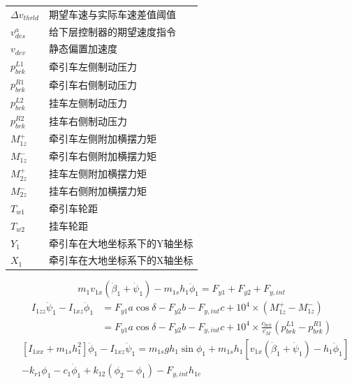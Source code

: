 {\begin{longtable}{l l}
        $\Delta v_{thrld}$ & 期望车速与实际车速差值阈值 \\
        $v_{des}^a$ & 给下层控制器的期望速度指令 \\
        $v_{dev}$ & 静态偏置加速度 \\
        $p_{brk}^{L1}$ & 牵引车左侧制动压力 \\
        $p_{brk}^{R1}$ & 牵引车右侧制动压力 \\
        $p_{brk}^{L2}$ & 挂车左侧制动压力 \\
        $p_{brk}^{R2}$ & 挂车右侧制动压力 \\
        $M_{1z}^+$ & 牵引车左侧附加横摆力矩 \\
        $M_{1z}^-$ & 牵引车右侧附加横摆力矩 \\
        $M_{2z}^+$ & 挂车左侧附加横摆力矩 \\
        $M_{2z}^-$ & 挂车右侧附加横摆力矩 \\
        $T_{w1}$ & 牵引车轮距 \\
        $T_{w2}$ & 挂车轮距 \\
        $Y_1$ & 牵引车在大地坐标系下的Y轴坐标 \\
        $X_1$ & 牵引车在大地坐标系下的X轴坐标 \\
        \end{longtable}
        }%
        \begin{equation}
        m_1 v_{1x}(\dot{\beta}_1 + \dot{\psi}_1) - m_{1s} h_1 \ddot{\phi}_1 = F_{y1} + F_{y2} + F_{y,int}
        \label{eq:tractor_lat}
        \end{equation}
        \begin{equation}
        \begin{aligned}
        I_{1zz} \ddot{\psi}_1 - I_{1xz} \ddot{\phi}_1 &= F_{y1} a \cos \delta - F_{y2} b - F_{y,int} c + 10^4 \times (M_{1z}^+ - M_{1z}^-) \\
        &= F_{y1} a \cos \delta - F_{y2} b - F_{y,int} c + 10^4 \times \frac{c_{brk}}{\overline{c_M}} \left(p_{brk}^{L1} - p_{brk}^{R1}\right)
        \end{aligned}
        \label{eq:tractor_yaw}
        \end{equation}
        \begin{equation}
        \begin{aligned}
        &[I_{1xx} + m_{1s} h_1^2] \ddot{\phi}_1 - I_{1xz} \ddot{\psi}_1 = m_{1s} g h_1 \sin \phi_1 + m_{1s} h_1 \left[ v_{1x}(\dot{\beta}_1 + \dot{\psi}_1) - h_1 \ddot{\phi}_1 \right] \\
        &- k_{r1} \phi_1 - c_1 \dot{\phi}_1 + k_{12}(\phi_2 - \phi_1) - F_{y,int} h_{1c}
        \end{aligned}
        \label{eq:tractor_roll}
        \end{equation}
